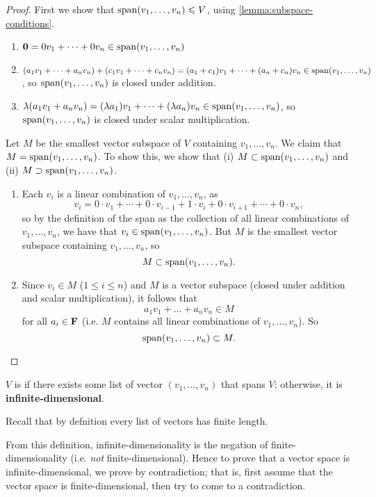 \begin{proof}
First we show that $\operatorname{span}(v_1,\dots,v_n)\leqslant V$, using \cref{lemma:subspace-conditions}.
\begin{enumerate}[label=(\roman*)]
\item $\vb{0}=0v_1+\cdots+0v_n\in\operatorname{span}(v_1,\dots,v_n)$
\item $(a_1v_1+\cdots+a_nv_n)+(c_1v_1+\cdots+c_nv_n)=(a_1+c_1)v_1+\cdots+(a_n+c_n)v_n\in\operatorname{span}(v_1,\dots,v_n)$, so $\operatorname{span}(v_1,\dots,v_n)$ is closed under addition.
\item $\lambda(a_1v_1+a_nv_n)=(\lambda a_1)v_1+\cdots+(\lambda a_n)v_n\in\operatorname{span}(v_1,\dots,v_n)$, so $\operatorname{span}(v_1,\dots,v_n)$ is closed under scalar multiplication.
\end{enumerate}

Let $M$ be the smallest vector subspace of $V$ containing $v_1,\dots,v_n$. We claim that $M=\operatorname{span}(v_1,\dots,v_n)$. To show this, we show that (i) $M\subset\operatorname{span}(v_1,\dots,v_n)$ and (ii) $M\supset\operatorname{span}(v_1,\dots,v_n)$.
\begin{enumerate}[label=(\roman*)]
\item Each $v_i$ is a linear combination of $v_1,\dots,v_n$, as
\[v_i=0\cdot v_1+\cdots+0\cdot v_{i-1}+1\cdot v_i+0\cdot v_{i+1}+\cdots+0\cdot v_n,\]
so by the definition of the span as the collection of all linear combinations of $v_1,\dots,v_n$, we have that $v_i\in\operatorname{span}(v_1,\dots,v_n)$. But $M$ is the smallest vector subspace containing $v_1,\dots,v_n$, so
\[M\subset\operatorname{span}(v_1,\dots,v_n).\]
\item Since $v_i\in M$ ($1\le i\le n$) and $M$ is a vector subspace (closed under addition and scalar multiplication), it follows that
\[a_1v_1+\dots+a_nv_n\in M\]
for all $a_i\in\mathbf F$ (i.e. $M$ contains all linear combinations of $v_1,\dots,v_n$). So
\[\operatorname{span}(v_1,\dots,v_n)\subset M.\]
\end{enumerate}
\end{proof}

\begin{definition}
$V$ is  if there exists some list of vector $(v_1,\dots,v_n)$ that spans $V$; otherwise, it is \textbf{infinite-dimensional}.
\end{definition}

\begin{remark}
Recall that by defnition every list of vectors has finite length.
\end{remark}

\begin{remark}
From this definition, infinite-dimensionality is the negation of finite-dimensionality (i.e. \emph{not} finite-dimensional). Hence to prove that a vector space is infinite-dimensional, we prove by contradiction; that is, first assume that the vector space is finite-dimensional, then try to come to a contradiction.
\end{remark}

